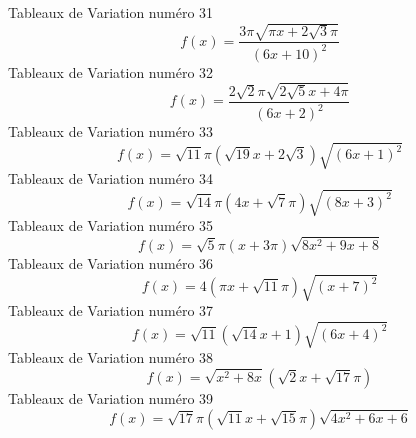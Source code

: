 \documentclass{article}
\begin{document}
\]Tableaux de Variation num\'ero 31 \[f(x) = \frac{3 \pi \sqrt{\pi x + 2 \sqrt{3} \pi}}{\left(6 x + 10\right)^{2}}\]Tableaux de Variation num\'ero 32 \[f(x) = \frac{2 \sqrt{2} \pi \sqrt{2 \sqrt{5} x + 4 \pi}}{\left(6 x + 2\right)^{2}}\]Tableaux de Variation num\'ero 33 \[f(x) = \sqrt{11} \pi \left(\sqrt{19} x + 2 \sqrt{3}\right) \sqrt{\left(6 x + 1\right)^{2}}\]Tableaux de Variation num\'ero 34 \[f(x) = \sqrt{14} \pi \left(4 x + \sqrt{7} \pi\right) \sqrt{\left(8 x + 3\right)^{2}}\]Tableaux de Variation num\'ero 35 \[f(x) = \sqrt{5} \pi \left(x + 3 \pi\right) \sqrt{8 x^{2} + 9 x + 8}\]Tableaux de Variation num\'ero 36 \[f(x) = 4 \left(\pi x + \sqrt{11} \pi\right) \sqrt{\left(x + 7\right)^{2}}\]Tableaux de Variation num\'ero 37 \[f(x) = \sqrt{11} \left(\sqrt{14} x + 1\right) \sqrt{\left(6 x + 4\right)^{2}}\]Tableaux de Variation num\'ero 38 \[f(x) = \sqrt{x^{2} + 8 x} \left(\sqrt{2} x + \sqrt{17} \pi\right)\]Tableaux de Variation num\'ero 39 \[f(x) = \sqrt{17} \pi \left(\sqrt{11} x + \sqrt{15} \pi\right) \sqrt{4 x^{2} + 6 x + 6}\]
\end{document}
